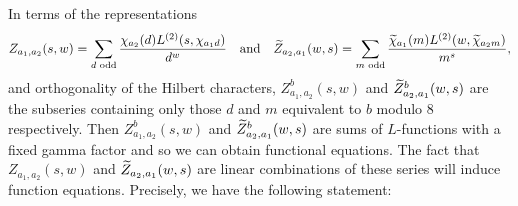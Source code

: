 \documentclass[12pt,reqno,oneside]{amsart}
\begin{document}
    In terms of the representations
    \[
        Z_{a_{1},a_{2}}(s,w) = \sum_{\text{$d$ odd}}\frac{\chi_{a_{2}}(d)L^{(2)}(s,\chi_{a_{1}d})}{d^{w}} \quad \text{and} \quad \widetilde{Z}_{a_{2},a_{1}}(w,s) = \sum_{\text{$m$ odd}}\frac{\widetilde{\chi}_{a_{1}}(m)L^{(2)}(w,\widetilde{\chi}_{a_{2}m})}{m^{s}},
    \]
    and orthogonality of the Hilbert characters, $Z_{a_{1},a_{2}}^{b}(s,w)$ and $\widetilde{Z}_{a_{2},a_{1}}^{b}(w,s)$ are the subseries containing only those $d$ and $m$ equivalent to $b$ modulo $8$ respectively. Then $Z_{a_{1},a_{2}}^{b}(s,w)$ and $\widetilde{Z}_{a_{2},a_{1}}^{b}(w,s)$ are sums of $L$-functions with a fixed gamma factor and so we can obtain functional equations. The fact that $Z_{a_{1},a_{2}}(s,w)$ and $\widetilde{Z}_{a_{2},a_{1}}(w,s)$ are linear combinations of these series will induce function equations. Precisely, we have the following statement:
\end{document}
